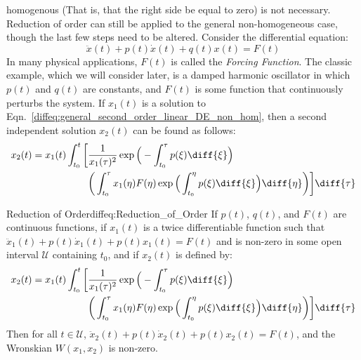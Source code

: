             homogenous (That is, that the right side be equal to zero)
            is not necessary. Reduction of order can still be applied
            to the general non-homogeneous case, though the last few
            steps need to be altered. Consider the differential equation:
            \begin{equation}
                \label{diffeq:general_second_order_linear_DE_non_hom}
                \ddot{x}(t)+p(t)\dot{x}(t)+q(t)x(t)=F(t)
            \end{equation}
            In many physical applications, $F(t)$ is called the
            \textit{Forcing Function}. The classic example,
            which we will
            consider later, is a damped harmonic oscillator in which
            $p(t)$ and $q(t)$ are constants, and $F(t)$
            is some function that
            continuously perturbs the system.
            If $x_{1}(t)$ is a solution to
            Eqn.~\ref{diffeq:general_second_order_linear_DE_non_hom},
            then a second independent solution $x_{2}(t)$
            can be found as follows:
            \begin{equation}
                \begin{split}
                    x_{2}(t)=
                    x_{1}(t)\int_{t_{0}}^{t}
                    \bigg[&\frac{1}{x_{1}(\tau)^{2}}
                    \exp\Big(
                        -\int_{t_{0}}^{\tau}p(\xi)\diff{\xi}\Big)\\
                    &\bigg(\int_{t_{0}}^{\tau}x_{1}(\eta)F(\eta)
                    \exp\Big(\int_{t_{0}}^{\eta}p(\xi)\diff{\xi}\Big)
                    \diff{\eta}\bigg)\bigg]\diff{\tau}
                \end{split}
            \end{equation}
            \begin{ftheorem}{Reduction of Order}{diffeq:Reduction_of_Order}
                If $p(t)$, $q(t)$, and $F(t)$ are continuous functions,
                if $x_{1}(t)$ is a twice differentiable function such that
                $\ddot{x}_{1}(t)+p(t)\dot{x}_{1}(t)+p(t)x_{1}(t)=F(t)$
                and is non-zero in some open interval $\mathcal{U}$
                containing $t_{0}$, and if $x_{2}(t)$ is defined by:
                \begin{equation*}
                    \begin{split}
                        x_{2}(t)=
                        x_{1}(t)\int_{t_{0}}^{t}
                        \bigg[&\frac{1}{x_{1}(\tau)^{2}}
                        \exp\Big(
                            -\int_{t_{0}}^{\tau}
                            p(\xi)\diff{\xi}\Big)\\
                        &\bigg(\int_{t_{0}}^{\tau}
                        x_{1}(\eta)F(\eta)
                        \exp\Big(\int_{t_{0}}^{\eta}p(\xi)\diff{\xi}\Big)
                        \diff{\eta}\bigg)\bigg]\diff{\tau}
                    \end{split}
                \end{equation*}
                Then for all $t\in\mathcal{U}$,
                $\ddot{x}_{2}(t)+p(t)\dot{x}_{2}(t)+p(t)x_{2}(t)=F(t)$,
                and the Wronskian $W(x_{1},x_{2})$ is non-zero.
            \end{ftheorem}

